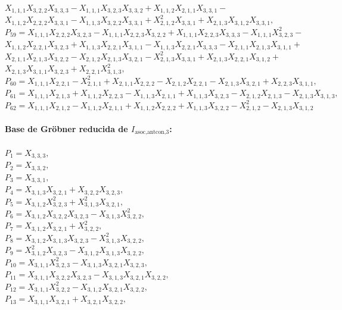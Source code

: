 \documentclass[10pt]{beamer}
\begin{document}
$X_{1,1,1}X_{3,2,2}X_{3,3,3}-X_{1,1,1}X_{3,2,3}X_{3,3,2}+X_{1,1,2}X_{2,1,1}X_{3,3,1}-$\\
$X_{1,1,2}X_{2,2,2}X_{3,3,1}-X_{1,1,3}X_{3,2,2}X_{3,3,1}+X_{2,1,2}^2X_{3,3,1}+X_{2,1,3}X_{3,1,2}X_{3,3,1},$\\
$P_{59}=X_{1,1,1}X_{2,2,2}X_{3,2,3}-X_{1,1,1}X_{2,2,3}X_{3,2,2}+X_{1,1,1}X_{2,2,3}X_{3,3,3}-X_{1,1,1}X_{3,2,3}^2-$\\
$X_{1,1,2}X_{2,2,1}X_{3,2,3}+X_{1,1,3}X_{2,2,1}X_{3,1,1}-X_{1,1,3}X_{2,2,1}X_{3,3,3}-X_{2,1,1}X_{2,1,3}X_{3,1,1}+$\\
$X_{2,1,1}X_{2,1,3}X_{3,2,2}-X_{2,1,2}X_{2,1,3}X_{3,2,1}-X_{2,1,3}^2X_{3,3,1}+X_{2,1,3}X_{2,2,1}X_{3,1,2}+$\\
$X_{2,1,3}X_{3,1,1}X_{3,2,3}+X_{2,2,1}X_{3,1,3}^2,$\\
$P_{60}=X_{1,1,1}X_{2,2,1}-X_{2,1,1}^2+X_{2,1,1}X_{2,2,2}-X_{2,1,2}X_{2,2,1}-X_{2,1,3}X_{3,2,1}+X_{2,2,3}X_{3,1,1},$\\
$P_{61}=X_{1,1,1}X_{2,1,3}+X_{1,1,2}X_{2,2,3}-X_{1,1,3}X_{2,1,1}+X_{1,1,3}X_{3,2,3}-X_{2,1,2}X_{2,1,3}-X_{2,1,3}X_{3,1,3},$\\
$P_{62}=X_{1,1,1}X_{2,1,2}-X_{1,1,2}X_{2,1,1}+X_{1,1,2}X_{2,2,2}+X_{1,1,3}X_{3,2,2}-X_{2,1,2}^2-X_{2,1,3}X_{3,1,2}$\\
\\
\textbf{Base de Gr\"obner reducida de $I_{\text{asoc,antcon,}3}$:}\\
\\
$P_{1}=X_{3,3,3},$\\
$P_{2}=X_{3,3,2},$\\
$P_{3}=X_{3,3,1},$\\
$P_{4}=X_{3,1,3}X_{3,2,1}+X_{3,2,2}X_{3,2,3},$\\
$P_{5}=X_{3,1,2}X_{3,2,3}^2+X_{3,1,3}^2X_{3,2,1},$\\
$P_{6}=X_{3,1,2}X_{3,2,2}X_{3,2,3}-X_{3,1,3}X_{3,2,2}^2,$\\
$P_{7}=X_{3,1,2}X_{3,2,1}+X_{3,2,2}^2,$\\
$P_{8}=X_{3,1,2}X_{3,1,3}X_{3,2,3}-X_{3,1,3}^2X_{3,2,2},$\\
$P_{9}=X_{3,1,2}^2X_{3,2,3}-X_{3,1,2}X_{3,1,3}X_{3,2,2},$\\
$P_{10}=X_{3,1,1}X_{3,2,3}^2-X_{3,1,3}X_{3,2,1}X_{3,2,3},$\\
$P_{11}=X_{3,1,1}X_{3,2,2}X_{3,2,3}-X_{3,1,3}X_{3,2,1}X_{3,2,2},$\\
$P_{12}=X_{3,1,1}X_{3,2,2}^2-X_{3,1,2}X_{3,2,1}X_{3,2,2},$\\
$P_{13}=X_{3,1,1}X_{3,2,1}+X_{3,2,1}X_{3,2,2},$\\
\end{document}
